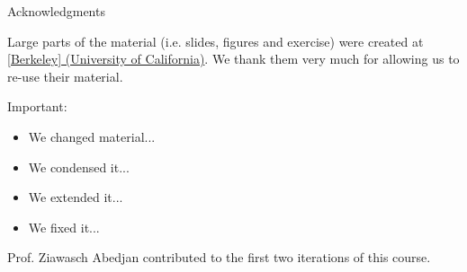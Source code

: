 \documentclass[aspectratio=169,handout]{../latex_main/tntbeamer}  %
\begin{document}
\begin{frame}[c]{Acknowledgments}

Large parts of the material (i.e. slides, figures and exercise) were created at \href{https://ds100.org/}{[Berkeley] (University of California)}. We thank them very much for allowing us to re-use their material.

\bigskip

\alert{Important}:
\begin{itemize}
    \item We changed material...
    \item We condensed it...
    \item We extended it...
    \item We fixed it...
\end{itemize}

\vspace{1em}

Prof. Ziawasch Abedjan contributed to the first two iterations of this course.

\end{frame}
\end{document}
